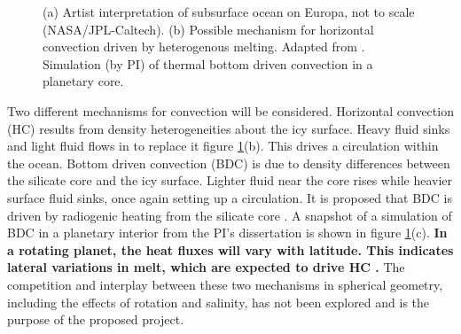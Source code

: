 \documentclass[12pt]{article}
\begin{document}
\begin{figure}[H]
	\begin{center}
		\quad
	\end{center}
	\caption{(a) Artist interpretation of subsurface ocean on Europa, not to scale (NASA/JPL-Caltech). (b) Possible mechanism for horizontal convection driven by heterogenous melting. Adapted from \citep{wK22}. Simulation (by PI) of thermal bottom driven convection in a planetary core\citep{tO25}.}
	\label{f:pic}
\end{figure}

Two different mechanisms for convection will be considered.
Horizontal convection (HC) results from density heterogeneities about the icy surface. Heavy fluid sinks and light fluid flows in to replace it figure \ref{f:pic}(b). This drives a circulation within the ocean. Bottom driven convection (BDC) is due to density differences between the silicate core and the icy surface. Lighter fluid near the core rises while heavier surface fluid sinks, once again setting up a circulation. 
It is proposed that BDC is driven by radiogenic heating from the silicate core \citep{kS14,kS19,jK22}. A snapshot of a simulation of BDC in a planetary interior from the PI's dissertation is shown in figure \ref{f:pic}(c)\citep{tO25}. 
\textbf{In a rotating planet, the heat fluxes will vary with latitude\citep{kS14}. This indicates lateral variations in melt, which are expected to drive HC \citep{wK22}.}
The competition and interplay between these two mechanisms in spherical geometry, including the effects of rotation and salinity, has not been explored and is the purpose of the proposed project.
\end{document}
